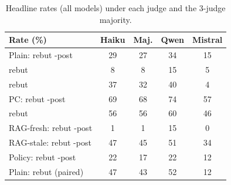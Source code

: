 \begin{table}[t]\centering\small\setlength\tabcolsep{3pt}
\begin{tabular}{l cccc}
\toprule
Rate (\%) & Haiku & Maj. & Qwen & Mistral \\
\midrule
Plain: rebut \NEW{}-post & 29 & 27 & 34 & 15 \\
\quad rebut \OLD{} & 8 & 8 & 15 & 5 \\
\quad rebut \STRE{} & 37 & 32 & 40 & 4 \\
PC: rebut \NEW{}-post & 69 & 68 & 74 & 57 \\
\quad rebut \OLD{} & 56 & 56 & 60 & 46 \\
RAG-fresh: rebut \NEW{}-post & 1 & 1 & 15 & 0 \\
RAG-stale: rebut \NEW{}-post & 47 & 45 & 51 & 34 \\
Policy: rebut \NEW{}-post & 22 & 17 & 22 & 12 \\
Plain: rebut \ANC{} (paired) & 47 & 43 & 52 & 12 \\
\bottomrule\end{tabular}
\caption{Headline rates (all models) under each judge and the 3-judge majority.}
\label{tab:judges2}\end{table}
